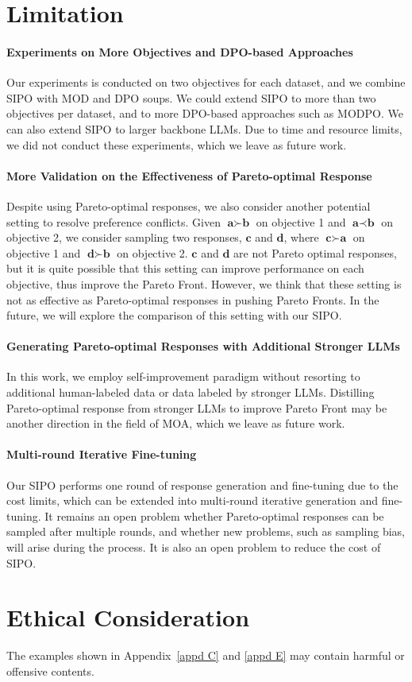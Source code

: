 \section*{Limitation}

\paragraph{Experiments on More Objectives and DPO-based Approaches}
Our experiments is conducted on two objectives for each dataset, and we combine SIPO with MOD and DPO soups. 
We could extend SIPO to more than two objectives per dataset, and to more DPO-based approaches such as MODPO. 
We can also extend SIPO to larger backbone LLMs. 
Due to time and resource limits, we did not conduct these experiments, which we leave as future work. 


\paragraph{More Validation on the Effectiveness of Pareto-optimal Response}
Despite using Pareto-optimal responses, we also consider another potential setting to resolve preference conflicts. 
Given $\textbf{a} \succ \textbf{b}$ on objective 1 and $\textbf{a} \prec \textbf{b}$ on objective 2, we consider sampling two responses, $\textbf{c}$ and $\textbf{d}$, where $\textbf{c} \succ \textbf{a}$ on objective 1 and $\textbf{d} \succ \textbf{b}$ on objective 2. 
$\textbf{c}$ and $\textbf{d}$ are not Pareto optimal responses, but it is quite possible that this setting can improve performance on each objective, thus improve the Pareto Front. 
However, we think that these setting is not as effective as Pareto-optimal responses in pushing Pareto Fronts. 
In the future, we will explore the comparison of this setting with our SIPO. 

\paragraph{Generating Pareto-optimal Responses with Additional Stronger LLMs}
In this work, we employ self-improvement paradigm without resorting to additional human-labeled data or data labeled by stronger LLMs. 
Distilling Pareto-optimal response from stronger LLMs to improve Pareto Front may be another direction in the field of MOA, which we leave as future work. 

\paragraph{Multi-round Iterative Fine-tuning}
Our SIPO performs one round of response generation and fine-tuning due to the cost limits, which can be extended into multi-round iterative generation and fine-tuning. 
It remains an open problem whether Pareto-optimal responses can be sampled after multiple rounds, and whether new problems, such as sampling bias, will arise during the process. It is also an open problem to reduce the cost of SIPO. 

\section*{Ethical Consideration}
The examples shown in Appendix~\ref{appd C} and \ref{appd E} may contain harmful or offensive contents. 